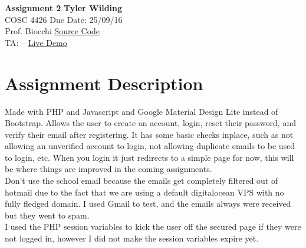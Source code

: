 \documentclass[a4paper, 11pt]{article}
\begin{document}
\noindent
\large\textbf{Assignment 2} \hfill \textbf{Tyler Wilding} \\
\normalsize COSC 4426 \hfill Due Date: 25/09/16 \\
Prof. Biocchi \hfill \href{https://github.com/xTVaser/Schoolwork-Fall-2016/tree/master/Internet%20Security/php-login}{Source Code} \\
TA: -- \hfill \href{https://notturing.ddns.net/tyler/IS_ASS2/form.php}{Live Demo}

\section*{Assignment Description}
Made with PHP and Javascript and Google Material Design Lite instead of Bootstrap.  Allows the user to create an account, login, reset their password, and verify their email after registering.  It has some basic checks inplace, such as not allowing an unverified account to login, not allowing duplicate emails to be used to login, etc.  When you login it just redirects to a simple page for now, this will be where things are improved in the coming assignments.\\

Don't use the school email because the emails get completely filtered out of hotmail due to the fact that we are using a default digitalocean VPS with no fully fledged domain.  I used Gmail to test, and the emails always were received but they went to spam.\\

I used the PHP session variables to kick the user off the secured page if they were not logged in, however I did not make the session variables expire yet.

%
\end{document}
